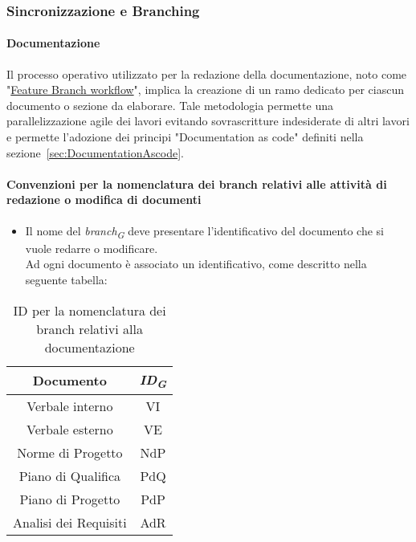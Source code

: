 \hypertarget{subsubsec:sincronizzazione&branching}{\subsubsection{Sincronizzazione e Branching}}
\paragraph{Documentazione}
Il processo operativo utilizzato per la redazione della documentazione, noto come "\href{https://www.atlassian.com/git/tutorials/comparing-workflows/feature-branch-workflow}{Feature Branch workflow}", implica la creazione di un ramo dedicato per ciascun documento o sezione da elaborare.
Tale metodologia permette una parallelizzazione agile dei lavori evitando sovrascritture indesiderate di altri lavori e permette l'adozione dei principi "Documentation as code" definiti nella sezione~\ref{sec:DocumentationAscode}. \\ 

\paragraph*{\hypertarget{par:convezioninomenclaturabranchdocumenti}{\textbf{Convenzioni per la nomenclatura dei branch relativi alle attività di redazione o modifica di documenti}}}

\begin{itemize}
    \item Il nome del \textit{branch}\textsubscript{\textit{G}} deve presentare l'identificativo del documento che si vuole redarre o modificare. \\
    Ad ogni documento è associato un identificativo, come descritto nella seguente tabella:
\end{itemize}

\begin{table}[H]
    \centering
    \begin{tabular}{|c|c|}
        \hline
        Documento & \textit{ID}\textsubscript{\textit{G}} \\
        \hline
        Verbale interno & VI \\
        Verbale esterno & VE \\
        Norme di Progetto & NdP \\
        Piano di Qualifica & PdQ \\
        Piano di Progetto & PdP \\ 
        Analisi dei Requisiti & AdR \\
        \hline
    \end{tabular}
    \caption{ID per la nomenclatura dei branch relativi alla documentazione}
\end{table}

